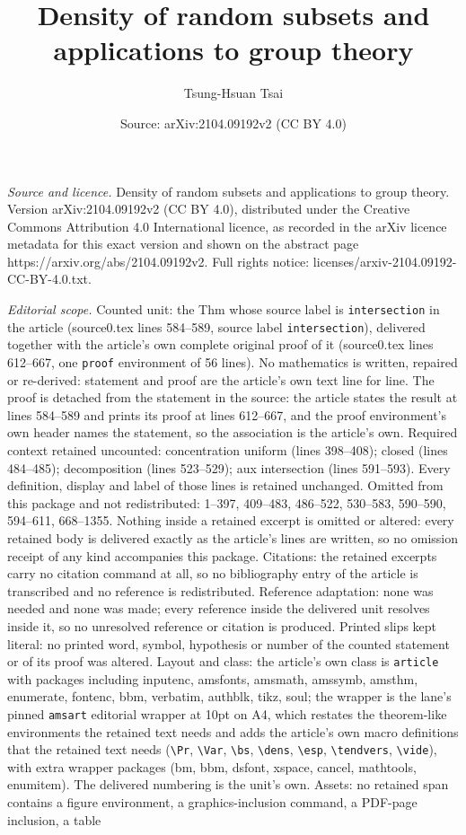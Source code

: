 \documentclass[10pt,a4paper]{amsart}
\title[Density of random subsets and applications to group theory]{Density of random subsets and applications to group theory}
\author{Tsung-Hsuan Tsai}
\date{Source: arXiv:2104.09192v2 (CC BY 4.0)}
\begin{document}
\maketitle

\noindent\emph{Source and licence.} Density of random subsets and applications to group theory. Version arXiv:2104.09192v2 (CC BY 4.0), distributed under the Creative Commons Attribution 4.0 International licence, as recorded in the arXiv licence metadata for this exact version and shown on the abstract page https://arxiv.org/abs/2104.09192v2. Full rights notice: licenses/arxiv-2104.09192-CC-BY-4.0.txt.\par\smallskip

\noindent\textit{Editorial scope.} Counted unit: the Thm whose source label is \texttt{intersection} in the article (source0.tex lines 584--589, source label \texttt{intersection}), delivered together with the article's own complete original proof of it (source0.tex lines 612--667, one \texttt{proof} environment of 56 lines). No mathematics is written, repaired or re-derived: statement and proof are the article's own text line for line. The proof is detached from the statement in the source: the article states the result at lines 584--589 and prints its proof at lines 612--667, and the proof environment's own header names the statement, so the association is the article's own. Required context retained uncounted: concentration uniform (lines 398--408); closed (lines 484--485); decomposition (lines 523--529); aux intersection (lines 591--593). Every definition, display and label of those lines is retained unchanged. Omitted from this package and not redistributed: 1--397, 409--483, 486--522, 530--583, 590--590, 594--611, 668--1355. Nothing inside a retained excerpt is omitted or altered: every retained body is delivered exactly as the article's lines are written, so no omission receipt of any kind accompanies this package. Citations: the retained excerpts carry no citation command at all, so no bibliography entry of the article is transcribed and no reference is redistributed. Reference adaptation: none was needed and none was made; every reference inside the delivered unit resolves inside it, so no unresolved reference or citation is produced. Printed slips kept literal: no printed word, symbol, hypothesis or number of the counted statement or of its proof was altered. Layout and class: the article's own class is \texttt{article} with packages including inputenc, amsfonts, amsmath, amssymb, amsthm, enumerate, fontenc, bbm, verbatim, authblk, tikz, soul; the wrapper is the lane's pinned \texttt{amsart} editorial wrapper at 10pt on A4, which restates the theorem-like environments the retained text needs and adds the article's own macro definitions that the retained text needs (\texttt{\textbackslash Pr}, \texttt{\textbackslash Var}, \texttt{\textbackslash bs}, \texttt{\textbackslash dens}, \texttt{\textbackslash esp}, \texttt{\textbackslash tendvers}, \texttt{\textbackslash vide}), with extra wrapper packages (bm, bbm, dsfont, xspace, cancel, mathtools, enumitem). The delivered numbering is the unit's own. Assets: no retained span contains a figure environment, a graphics-inclusion command, a PDF-page inclusion, a table 
\end{document}
